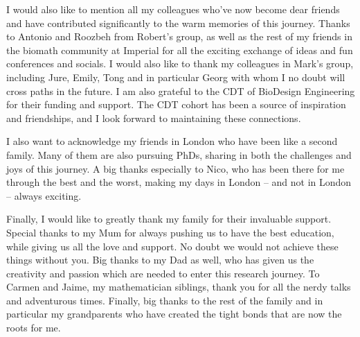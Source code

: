 \documentclass[
    11pt,
    oneside, %
    english,
    onehalfspacing, %
    parskip, %
]{PhDDoctoralThesis}
\begin{document}
    I would also like to mention all my colleagues who've now become dear friends and have contributed significantly to the warm memories of this journey.
    Thanks to Antonio and Roozbeh from Robert's group, as well as the rest of my friends in the biomath community at Imperial for all the exciting exchange of ideas and fun conferences and socials.
    I would also like to thank my colleagues in Mark's group, including Jure, Emily, Tong and in particular Georg with whom I no doubt will cross paths in the future. I am also grateful to the CDT of BioDesign Engineering for their funding and support.
    The CDT cohort has been a source of inspiration and friendships, and I look forward to maintaining these connections.

    I also want to acknowledge my friends in London who have been like a second family.
    Many of them are also pursuing PhDs, sharing in both the challenges and joys of this journey.
    A big thanks especially to Nico, who has been there for me through the best and the worst, making my days in London – and not in London – always exciting.


    Finally, I would like to greatly thank my family for their invaluable support.
    Special thanks to my Mum for always pushing us to have the best education, while giving us all the love and support.
    No doubt we would not achieve these things without you.
    Big thanks to my Dad as well, who has given us the creativity and passion which are needed to enter this research journey.
    To Carmen and Jaime, my mathematician siblings, thank you for all the nerdy talks and adventurous times.
    Finally, big thanks to the rest of the family and in particular my grandparents who have created the tight bonds that are now the roots for me.



    \tableofcontents





    \mainmatter %

    \pagestyle{thesis} %

    \clearpage

    
    
    
    
    
    

    \printglossary[type=\acronymtype]

    \printbibliography[heading=bibintoc]
    
\end{document}
